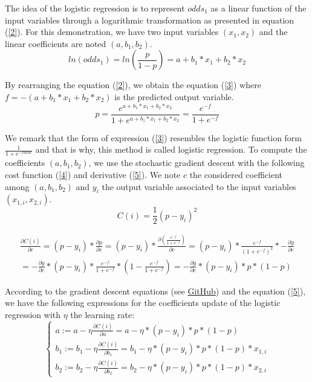 \documentclass{article}
\begin{document}
The idea of the logistic regression is to represent \(odds_{1}\) as a linear function of the input variables through a logarithmic transformation as presented in equation (\ref{2}). For this demonstration, we have two input variables \((x_{1}, x_{2})\) and the linear coefficients are noted \((a, b_{1}, b_{2})\). 
\begin{equation} \label{2}
    ln(odds_{1}) = ln(\frac{p}{1-p}) = a + b_{1} * x_{1} + b_{2} * x_{2}
\end{equation}

By rearranging the equation (\ref{2}), we obtain the equation (\ref{3}) where \(f = - (a + b_{1} * x_{1} + b_{2} * x_{2})\) is the predicted output variable. 
\begin{equation} \label{3}
    p = \frac{e^{a + b_{1} * x_{1} + b_{2} * x_{2}}}{1 + e^{a + b_{1} * x_{1} + b_{2} * x_{2}}} = \frac{e^{-f}}{1 + e^{-f}}
\end{equation}

We remark that the form of expression (\ref{3}) resembles the logistic function form \(\frac{1}{1+e^{-value}}\) and that is why, this method is called logistic regression. To compute the coefficients \((a, b_{1}, b_{2})\), we use the stochastic gradient descent with the following cost function (\ref{4}) and derivative (\ref{5}). We note \(c\) the considered coefficient among \((a, b_{1}, b_{2})\) and \(y_{i}\) the output variable associated to the input variables \((x_{1,i}, x_{2,i})\).
\begin{equation} \label{4}
    C(i) = \frac{1}{2}(p-y_{i})^{2}
\end{equation}

\begin{multline}\label{5}
    \frac{\partial{C(i)}}{\partial{c}} = (p-y_{i})*\frac{\partial{p}}{\partial{c}} = (p-y_{i})*\frac{\partial{(\frac{e^{-f}}{1 + e^{-f}})}}{\partial{c}} = (p-y_{i})*\frac{e^{-f}}{(1 + e^{-f})^{2}}*-\frac{\partial{y}}{\partial{c}} \\ = -\frac{\partial{y}}{\partial{c}}*(p-y_{i})*\frac{e^{-f}}{1 + e^{-f}}*(1-\frac{e^{-f}}{1 + e^{-f}}) = -\frac{\partial{y}}{\partial{c}}*(p-y_{i})*p*(1-p)
\end{multline}

According to the gradient descent equations (see \href{https://github.com/SophMarch/Tutorials}{GitHub}) and the equation (\ref{5}), we have the following expressions for the coefficients update of the logistic regression with \(\eta\) the learning rate:
\begin{equation}\label{6}
    \begin{cases}
    a := a - \eta\frac{\partial C(i)}{\partial a} = a - \eta*(p-y_{i})*p*(1-p) \\
    b_{1} := b_{1} - \eta\frac{\partial C(i)}{\partial b_{1}} = b_{1} - \eta*(p-y_{i})*p*(1-p)*x_{1,i}\\
    b_{2} := b_{2} - \eta\frac{\partial C(i)}{\partial b_{2}} = b_{2} - \eta*(p-y_{i})*p*(1-p)*x_{2,i}
    \end{cases}
\end{equation}
\end{document}
